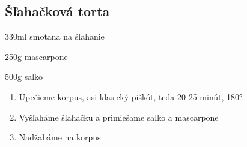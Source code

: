 \setcounter{step}{0}
\subsection{Šľahačková torta}

\begin{ingredient}
\def\portions{4}%

\begin{main}
	\item 330ml smotana na šľahanie
	\item 250g mascarpone
	\item 500g salko
\end{main}
\end{ingredient}
\begin{recipe}

\begin{enumerate}

\item{Upečieme korpus, asi klasický piškót, teda 20-25 minút, 180°}
\item{Vyšľaháme šľahačku a primiešame salko a mascarpone}
\item{Nadžabáme na korpus}

\end{enumerate}
\end{recipe}

\begin{notes}

\end{notes}
\clearpage	